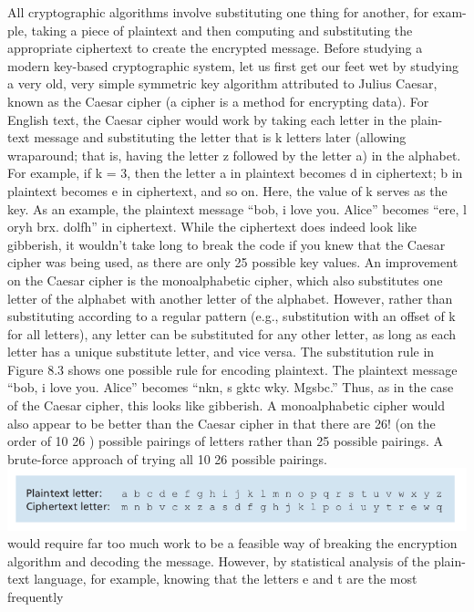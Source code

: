 \documentclass{report}
\theoremstyle{definition}
\begin{document}
{{{All cryptographic algorithms involve substituting one thing for another, for exam-
ple, taking a piece of plaintext and then computing and substituting the appropriate
ciphertext to create the encrypted message. Before studying a modern key-based
cryptographic system, let us first get our feet wet by studying a very old, very simple
symmetric key algorithm attributed to Julius Caesar, known as the Caesar cipher
(a cipher is a method for encrypting data).
For English text, the Caesar cipher would work by taking each letter in the plain-
text message and substituting the letter that is k letters later (allowing wraparound;
that is, having the letter z followed by the letter a) in the alphabet. For example, if
k = 3, then the letter a in plaintext becomes d in ciphertext; b in plaintext becomes
e in ciphertext, and so on. Here, the value of k serves as the key. As an example, the
plaintext message “bob, i love you. Alice” becomes “ere, l oryh
brx. dolfh” in ciphertext. While the ciphertext does indeed look like gibberish,
it wouldn’t take long to break the code if you knew that the Caesar cipher was being
used, as there are only 25 possible key values.
An improvement on the Caesar cipher is the monoalphabetic cipher, which also
substitutes one letter of the alphabet with another letter of the alphabet. However,
rather than substituting according to a regular pattern (e.g., substitution with an offset
of k for all letters), any letter can be substituted for any other letter, as long as each
letter has a unique substitute letter, and vice versa. The substitution rule in Figure 8.3
shows one possible rule for encoding plaintext.
The plaintext message “bob, i love you. Alice” becomes “nkn, s
gktc wky. Mgsbc.” Thus, as in the case of the Caesar cipher, this looks like
gibberish. A monoalphabetic cipher would also appear to be better than the Caesar
cipher in that there are 26! (on the order of 10 26 ) possible pairings of letters rather
than 25 possible pairings. A brute-force approach of trying all 10 26 possible pairings.\newline
\includegraphics[scale=0.5]{plant}\newline
would require far too much work to be a feasible way of breaking the encryption
algorithm and decoding the message. However, by statistical analysis of the plain-
text language, for example, knowing that the letters e and t are the most frequently
}}}
\end{document}
